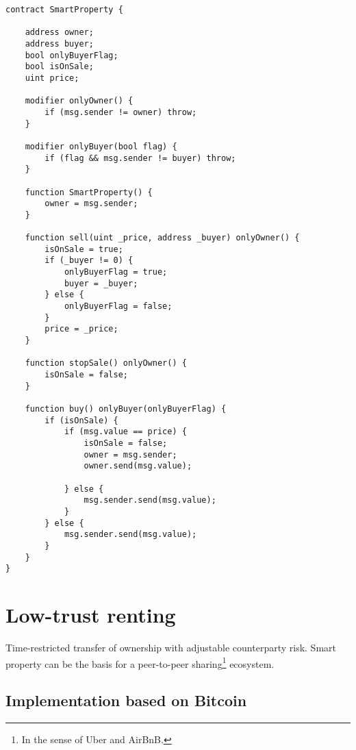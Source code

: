 {\newpage
\begin{lstlisting}[breaklines,basicstyle=\tiny]
contract SmartProperty {
    
    address owner;
    address buyer;
    bool onlyBuyerFlag;
    bool isOnSale;
    uint price;
    
    modifier onlyOwner() {
        if (msg.sender != owner) throw;
    }
    
    modifier onlyBuyer(bool flag) {
        if (flag && msg.sender != buyer) throw;
    }
    
    function SmartProperty() {
        owner = msg.sender;
    }
    
    function sell(uint _price, address _buyer) onlyOwner() {
        isOnSale = true;
        if (_buyer != 0) {
            onlyBuyerFlag = true;
            buyer = _buyer;
        } else {
            onlyBuyerFlag = false;
        }
        price = _price;
    }
    
    function stopSale() onlyOwner() {
        isOnSale = false;
    }
        
    function buy() onlyBuyer(onlyBuyerFlag) {
        if (isOnSale) {
            if (msg.value == price) {
                isOnSale = false;
                owner = msg.sender;
                owner.send(msg.value);
                
            } else {
                msg.sender.send(msg.value);
            }
        } else {
            msg.sender.send(msg.value);
        }
    }
}
\end{lstlisting}


\section{Low-trust renting}

Time-restricted transfer of ownership with adjustable counterparty risk. Smart property can be the basis for a peer-to-peer sharing\footnote{In the sense of Uber and AirBnB.} ecosystem. 

\subsection{Implementation based on Bitcoin}

}
